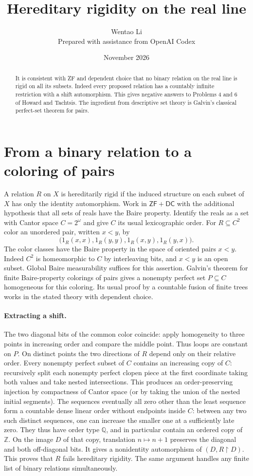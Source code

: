 \documentclass[11pt]{article}
\title{Hereditary rigidity on the real line}
\author{Wentao Li\\[2pt]\small Prepared with assistance from OpenAI Codex}
\date{November 2026}
\begin{document}
\maketitle
\begin{abstract}
It is consistent with ZF and dependent choice that no binary relation on the real line is rigid on all its subsets. Indeed every proposed relation has a countably infinite restriction with a shift automorphism. This gives negative answers to Problems 4 and 6 of Howard and Tachtsis. The ingredient from descriptive set theory is Galvin's classical perfect-set theorem for pairs.
\end{abstract}
\section{From a binary relation to a coloring of pairs}
A relation $R$ on $X$ is hereditarily rigid if the induced structure on each subset of $X$ has only the identity automorphism. Work in $\mathsf{ZF}+\mathsf{DC}$ with the additional hypothesis that all sets of reals have the Baire property. Identify the reals as a set with Cantor space $C=2^\omega$ and give $C$ its usual lexicographic order. For $R\subseteq C^2$ color an unordered pair, written $x<y$, by
\[
\bigl(1_R(x,x),1_R(y,y),1_R(x,y),1_R(y,x)\bigr).
\]
The color classes have the Baire property in the space of oriented pairs $x<y$. Indeed $C^2$ is homeomorphic to $C$ by interleaving bits, and $x<y$ is an open subset. Global Baire measurability suffices for this assertion. Galvin's theorem for finite Baire-property colorings of pairs gives a nonempty perfect set $P\subseteq C$ homogeneous for this coloring. Its usual proof by a countable fusion of finite trees works in the stated theory with dependent choice.
\paragraph{Extracting a shift.} The two diagonal bits of the common color coincide: apply homogeneity to three points in increasing order and compare the middle point. Thus loops are constant on $P$. On distinct points the two directions of $R$ depend only on their relative order. Every nonempty perfect subset of $C$ contains an increasing copy of $C$: recursively split each nonempty perfect clopen piece at the first coordinate taking both values and take nested intersections. This produces an order-preserving injection by compactness of Cantor space (or by taking the union of the nested initial segments). The sequences eventually all zero other than the least sequence form a countable dense linear order without endpoints inside $C$: between any two such distinct sequences, one can increase the smaller one at a sufficiently late zero. They thus have order type $\mathbb Q$, and in particular contain an ordered copy of $\mathbb Z$. On the image $D$ of that copy, translation $n\mapsto n+1$ preserves the diagonal and both off-diagonal bits. It gives a nonidentity automorphism of $(D,R\restriction D)$. This proves that $R$ fails hereditary rigidity. The same argument handles any finite list of binary relations simultaneously.
\end{document}
